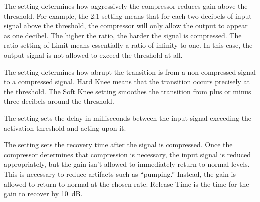 The  setting determines how aggressively the compressor reduces
gain above the threshold.  For example, the 2:1 setting means that for each
two decibels of input signal above the threshold, the compressor will only
allow the output to appear as one decibel.  The higher the ratio, the harder
the signal is compressed.  The ratio setting of Limit means essentially a ratio
of infinity to one.  In this case, the output signal is not allowed to exceed
the threshold at all.

The  setting determines how abrupt the transition is from a
non-compressed signal to a compressed signal.  Hard Knee means that the
transition occurs precisely at the threshold.  The Soft Knee setting smoothes
the transition from plus or minus three decibels around the threshold.

The  setting sets the delay in milliseconds between the
input signal exceeding the activation threshold and acting upon it.

The  setting sets the recovery time after the signal is
compressed.  Once the compressor determines that compression is necessary,
the input signal is reduced appropriately, but the gain isn't allowed to
immediately return to normal levels.  This is necessary to reduce artifacts
such as ``pumping.''  Instead, the gain is allowed to return to normal at the
chosen rate.  Release Time is the time for the gain to recover by 10~dB.
